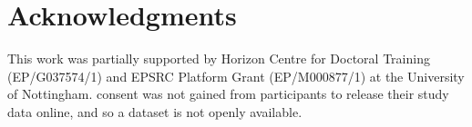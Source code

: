 \documentclass[../main/Feedback.tex]{subfiles}
\begin{document}
\section{Acknowledgments}
This work was partially supported by Horizon Centre for Doctoral Training (EP/G037574/1) and EPSRC Platform Grant (EP/M000877/1) at the University of Nottingham.
 consent was not gained from participants to release their study data online, and so a dataset is not openly available.
\end{document}
